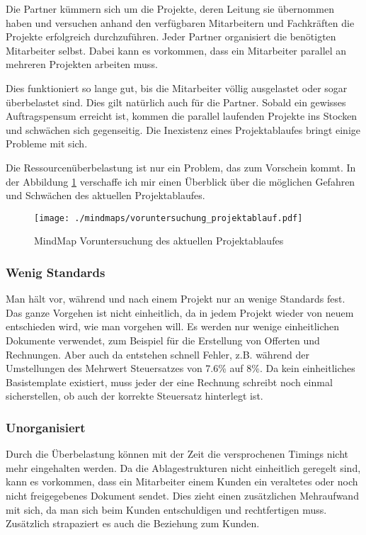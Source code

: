 Die Partner kümmern sich um die Projekte, deren Leitung sie übernommen haben
und versuchen anhand den verfügbaren Mitarbeitern und Fachkräften die Projekte 
erfolgreich durchzuführen. Jeder Partner organisiert die benötigten Mitarbeiter
selbst. Dabei kann es vorkommen, dass ein Mitarbeiter parallel an
mehreren Projekten arbeiten muss.

Dies funktioniert so lange gut, bis die Mitarbeiter völlig ausgelastet oder sogar
überbelastet sind. Dies gilt natürlich auch für die Partner. Sobald ein gewisses 
Auftragspensum erreicht ist, kommen die parallel laufenden Projekte ins Stocken 
und schwächen sich gegenseitig. Die Inexistenz eines Projektablaufes bringt
einige Probleme mit sich.

Die Ressourcenüberbelastung ist nur ein Problem, das zum Vorschein kommt. In der
Abbildung \ref{pic:voruntersuchung_projektablauf} verschaffe ich mir einen 
Überblick über die möglichen Gefahren und Schwächen des aktuellen Projektablaufes.

\begin{figure}[htbp]
\begin{center}
\texttt{[image: ./mindmaps/voruntersuchung\_projektablauf.pdf]}
\caption{MindMap Voruntersuchung des aktuellen Projektablaufes}
\label{pic:voruntersuchung_projektablauf}
\end{center}
\end{figure}

\subsubsection{Wenig Standards}
Man hält vor, während und nach einem Projekt nur an wenige Standards fest. 
Das ganze Vorgehen ist nicht einheitlich, da in jedem Projekt wieder von
neuem entschieden wird, wie man vorgehen will. Es werden nur wenige einheitlichen
Dokumente verwendet, zum Beispiel für die Erstellung von Offerten und Rechnungen.
Aber auch da entstehen schnell Fehler, z.B. während der Umstellungen des 
Mehrwert Steuersatzes von 7.6\% auf 8\%. Da kein einheitliches Basistemplate
existiert, muss jeder der eine Rechnung schreibt noch einmal sicherstellen, ob
auch der korrekte Steuersatz hinterlegt ist. 

\subsubsection{Unorganisiert}
Durch die Überbelastung können mit der Zeit die versprochenen Timings
nicht mehr eingehalten werden. Da die Ablagestrukturen nicht einheitlich geregelt
sind, kann es vorkommen, dass ein Mitarbeiter einem Kunden ein veraltetes oder
noch nicht freigegebenes Dokument sendet. Dies zieht einen zusätzlichen 
Mehraufwand mit sich, da man sich beim Kunden entschuldigen und rechtfertigen
muss. Zusätzlich strapaziert es auch die Beziehung zum Kunden.

